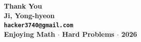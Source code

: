 \documentclass[10pt,aspectratio=1610,compress,dvipsnames]{beamer}
\begin{document}
\begin{frame}[plain]
  \begin{center}\bfseries\centering
    \vspace{2cm}
    {\Huge\color{TealDarkCyan} Thank You}\\[.5cm]
    {\large\color{black} Ji, Yong-hyeon}\\[.3cm]
    {\normalsize\texttt{hacker3740@gmail.com}}\\[.5cm]
    {\small\color{gray} Enjoying Math $\cdot$ Hard Problems $\cdot$ 2026}
    \bigskip
  \end{center}
\end{frame}
\end{document}
